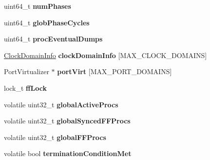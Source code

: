 \begin{DoxyCompactItemize}
\item 
\hypertarget{structGlobSimInfo_a09a6d317523c2d43cff987cbcde4e81f}{uint64\-\_\-t {\bfseries num\-Phases}}\label{structGlobSimInfo_a09a6d317523c2d43cff987cbcde4e81f}

\item 
\hypertarget{structGlobSimInfo_a9726d93b4bc12ef3dde688e8683957ab}{uint64\-\_\-t {\bfseries glob\-Phase\-Cycles}}\label{structGlobSimInfo_a9726d93b4bc12ef3dde688e8683957ab}

\item 
\hypertarget{structGlobSimInfo_a3d33a3c963397be81bac3c2b37a12ad2}{uint64\-\_\-t {\bfseries proc\-Eventual\-Dumps}}\label{structGlobSimInfo_a3d33a3c963397be81bac3c2b37a12ad2}

\item 
\hypertarget{structGlobSimInfo_af8378c04ef3ef25f63f9e51e990d61f1}{\hyperlink{structClockDomainInfo}{Clock\-Domain\-Info} {\bfseries clock\-Domain\-Info} \mbox{[}M\-A\-X\-\_\-\-C\-L\-O\-C\-K\-\_\-\-D\-O\-M\-A\-I\-N\-S\mbox{]}}\label{structGlobSimInfo_af8378c04ef3ef25f63f9e51e990d61f1}

\item 
\hypertarget{structGlobSimInfo_a30b68165d338774ece1ca1a6c06b451d}{Port\-Virtualizer $\ast$ {\bfseries port\-Virt} \mbox{[}M\-A\-X\-\_\-\-P\-O\-R\-T\-\_\-\-D\-O\-M\-A\-I\-N\-S\mbox{]}}\label{structGlobSimInfo_a30b68165d338774ece1ca1a6c06b451d}

\item 
\hypertarget{structGlobSimInfo_a69cf10fef90638b9442e849732937c97}{lock\-\_\-t {\bfseries ff\-Lock}}\label{structGlobSimInfo_a69cf10fef90638b9442e849732937c97}

\item 
\hypertarget{structGlobSimInfo_a072ea87d58891afc429f6d8bc37e9898}{volatile uint32\-\_\-t {\bfseries global\-Active\-Procs}}\label{structGlobSimInfo_a072ea87d58891afc429f6d8bc37e9898}

\item 
\hypertarget{structGlobSimInfo_a27cc07be244ada17af3453860edf98c6}{volatile uint32\-\_\-t {\bfseries global\-Synced\-F\-F\-Procs}}\label{structGlobSimInfo_a27cc07be244ada17af3453860edf98c6}

\item 
\hypertarget{structGlobSimInfo_a8fad466dcb1b5bd3fd57b33b4d232856}{volatile uint32\-\_\-t {\bfseries global\-F\-F\-Procs}}\label{structGlobSimInfo_a8fad466dcb1b5bd3fd57b33b4d232856}

\item 
\hypertarget{structGlobSimInfo_adb965860c8fffe9b725c5f6c93d44312}{volatile bool {\bfseries termination\-Condition\-Met}}\label{structGlobSimInfo_adb965860c8fffe9b725c5f6c93d44312}


\end{DoxyCompactItemize}
